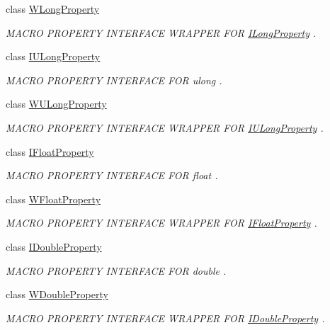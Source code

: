 \begin{DoxyCompactItemize}
class \hyperlink{class_w_long_property}{W\-Long\-Property}
\begin{DoxyCompactList}\small\item\em M\-A\-C\-R\-O P\-R\-O\-P\-E\-R\-T\-Y I\-N\-T\-E\-R\-F\-A\-C\-E W\-R\-A\-P\-P\-E\-R F\-O\-R \hyperlink{class_i_long_property}{I\-Long\-Property} . \end{DoxyCompactList}\item 
class \hyperlink{class_i_u_long_property}{I\-U\-Long\-Property}
\begin{DoxyCompactList}\small\item\em M\-A\-C\-R\-O P\-R\-O\-P\-E\-R\-T\-Y I\-N\-T\-E\-R\-F\-A\-C\-E F\-O\-R ulong . \end{DoxyCompactList}\item 
class \hyperlink{class_w_u_long_property}{W\-U\-Long\-Property}
\begin{DoxyCompactList}\small\item\em M\-A\-C\-R\-O P\-R\-O\-P\-E\-R\-T\-Y I\-N\-T\-E\-R\-F\-A\-C\-E W\-R\-A\-P\-P\-E\-R F\-O\-R \hyperlink{class_i_u_long_property}{I\-U\-Long\-Property} . \end{DoxyCompactList}\item 
class \hyperlink{class_i_float_property}{I\-Float\-Property}
\begin{DoxyCompactList}\small\item\em M\-A\-C\-R\-O P\-R\-O\-P\-E\-R\-T\-Y I\-N\-T\-E\-R\-F\-A\-C\-E F\-O\-R float . \end{DoxyCompactList}\item 
class \hyperlink{class_w_float_property}{W\-Float\-Property}
\begin{DoxyCompactList}\small\item\em M\-A\-C\-R\-O P\-R\-O\-P\-E\-R\-T\-Y I\-N\-T\-E\-R\-F\-A\-C\-E W\-R\-A\-P\-P\-E\-R F\-O\-R \hyperlink{class_i_float_property}{I\-Float\-Property} . \end{DoxyCompactList}\item 
class \hyperlink{class_i_double_property}{I\-Double\-Property}
\begin{DoxyCompactList}\small\item\em M\-A\-C\-R\-O P\-R\-O\-P\-E\-R\-T\-Y I\-N\-T\-E\-R\-F\-A\-C\-E F\-O\-R double . \end{DoxyCompactList}\item 
class \hyperlink{class_w_double_property}{W\-Double\-Property}
\begin{DoxyCompactList}\small\item\em M\-A\-C\-R\-O P\-R\-O\-P\-E\-R\-T\-Y I\-N\-T\-E\-R\-F\-A\-C\-E W\-R\-A\-P\-P\-E\-R F\-O\-R \hyperlink{class_i_double_property}{I\-Double\-Property} . \end{DoxyCompactList}\item 

\end{DoxyCompactItemize}

